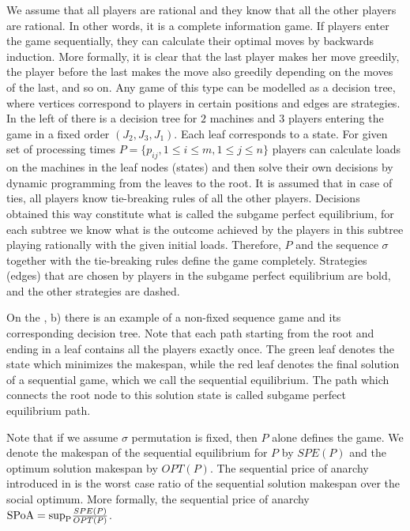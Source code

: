 \documentclass[12pt,a4paper]{article}
\theoremstyle{definition}
\theoremstyle{remark}
\newcommand{\SPoA}{SPoA}
\begin{document}
We assume that all players are rational and they  know that all the other players are rational. In other words, it is a complete information game. If players enter the game sequentially, they can calculate their optimal moves by backwards induction. More formally, it is clear that the last player makes her move greedily, the player before the last makes the move also greedily depending on the moves of the last, and so on.  Any game of this type can be modelled as a decision tree, where vertices correspond to players in certain positions and edges are strategies. In the left of  there is a decision tree for $2$ machines and $3$ players entering the game in a fixed order $(J_2, J_3, J_1)$.  Each leaf corresponds to a state. For given set of processing times $P=\{p_{ij}, 1\leq i \leq m, 1\leq j \leq n\}$ players can calculate loads on the machines in the leaf nodes (states) and then solve their own decisions by dynamic programming from the leaves to the root. It is assumed that in  case of ties, all players know tie-breaking rules of all the other players. Decisions obtained this way constitute what is called the subgame perfect equilibrium, for each subtree we know what is the outcome achieved by the players in this subtree playing rationally with the given initial loads. Therefore, $P$ and the sequence $\sigma$ together with the tie-breaking rules define the game completely. Strategies (edges) that are chosen by players in the subgame perfect equilibrium are bold, and the other strategies are dashed. 

On the  , b) there is an example of a non-fixed sequence game and its corresponding decision tree. Note that each path starting from the root and ending in a leaf contains all the players exactly once. The green leaf denotes the state which minimizes the makespan, while the red leaf denotes the final solution of a sequential game, which we call the sequential equilibrium. The path which connects the root node to this solution state is called subgame perfect equilibrium path. 

Note that if we assume $\sigma$ permutation is fixed, then $P$ alone defines the game. We denote the makespan of the sequential equilibrium for $P$ by $SPE(P)$ and the optimum solution makespan by $OPT(P)$. The sequential price of anarchy introduced in \cite{originalSPOA} is the worst case ratio of the sequential solution makespan over the social optimum. More formally, the sequential price of anarchy $\text{\\SPoA} = \text{sup}_{\text{P}} \frac{SPE(P)}{OPT(P)}$.
\end{document}
